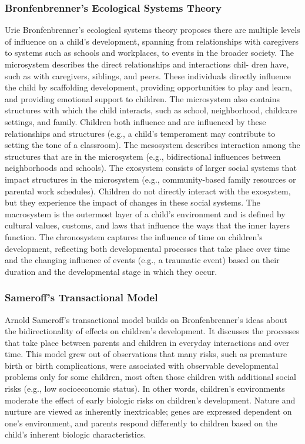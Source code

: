 \subsubsection{Bronfenbrenner's Ecological Systems Theory}
Urie Bronfenbrenner's ecological systems theory
proposes there are multiple levels of influence on a child’s development,
spanning from relationships with caregivers to systems such as schools and
workplaces, to events in the broader society. The microsystem
describes the direct relationships and interactions chil- dren have, such as
with caregivers, siblings, and peers. These individuals directly influence the
child by scaffolding development, providing opportunities to play and learn,
and providing emotional support to children. The microsystem also contains
structures with which the child interacts, such as school, neighborhood,
childcare settings, and family. Children both influence and are influenced by
these relationships and structures (e.g., a child’s temperament may contribute
to setting the tone of a classroom). The mesosystem describes interaction among
the structures that are in the microsystem (e.g., bidirectional influences
between neighborhoods and schools). The exosystem consists of larger social
systems that impact structures in the microsystem (e.g., community-based family
resources or parental work schedules). Children do not directly interact with
the exosystem, but they experience the impact of changes in these social
systems. The macrosystem is the outermost layer of a child’s environment and is
defined by cultural values, customs, and laws that influence the ways that the
inner layers function. The chronosystem captures the influence of time on
children’s development, reflecting both developmental processes that take place
over time and the changing influence of events (e.g., a traumatic event) based
on their duration and the developmental stage in which they occur.
\cite{Feldman3}

\subsubsection{Sameroff's Transactional Model}
Arnold Sameroff's transactional model builds on Bronfenbrenner's ideas about
the bidirectionality of effects on children’s development. It discusses the
processes that take place between parents and children in everyday interactions
and over time. This model grew out of observations that many risks, such as
premature birth or birth complications, were associated with observable
developmental problems only for some children, most often those children with
additional social risks (e.g., low socioeconomic status). In other words,
children’s environments moderate the effect of early biologic risks on
children’s development. Nature and nurture are viewed as inherently
inextricable; genes are expressed dependent on one’s environment, and parents
respond differently to children based on the child’s inherent biologic
characteristics.
\cite{Feldman3}

